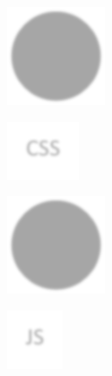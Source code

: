 \documentclass[12pt]{article}
\begin{document}
\begin{figure}[H]
\includegraphics[width=0.5\linewidth]{page54-image-4.png}
\end{figure}
\begin{figure}[H]
\includegraphics[width=0.5\linewidth]{page54-image-5.png}
\end{figure}
\begin{figure}[H]
\includegraphics[width=0.5\linewidth]{page54-image-6.png}
\end{figure}
\begin{figure}[H]
\includegraphics[width=0.5\linewidth]{page54-image-7.png}
\end{figure}
\end{document}

